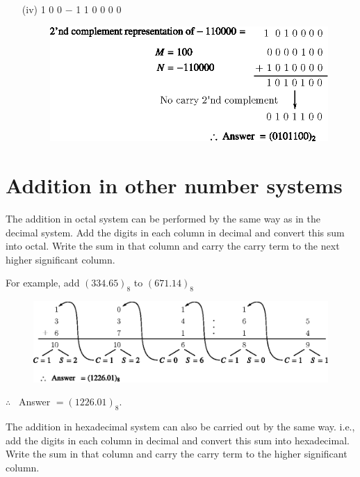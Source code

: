 \begin{solution}
\begin{itemize}
\item[(iv)] 1 0 0 $-$ 1 1 0 0 0 0
\begin{figure}[H]
\centering
\includegraphics{chap5/div45.eps}
\end{figure}
\end{itemize}
\end{solution}

\section{Addition in other number systems}\label{sec7.7}


The addition in octal system can be performed by the same way as in the decimal system. Add the digits in each column in decimal and convert this sum into octal. Write the sum in that column and carry the carry term to the next higher significant column.

For example, add $(334.65)_{8}$ to $(671.14)_{8}$
\begin{figure}[H]
\centering
\includegraphics{chap5/div46.eps}
\end{figure}

\noindent
$\therefore$~ Answer $= (1226.01)_{8}$.

\smallskip
{}

The addition in hexadecimal system can also be carried out by the same way. i.e., add the digits in each column in decimal and convert this sum into hexadecimal. Write the sum in that column and carry the carry term to the higher significant column.

